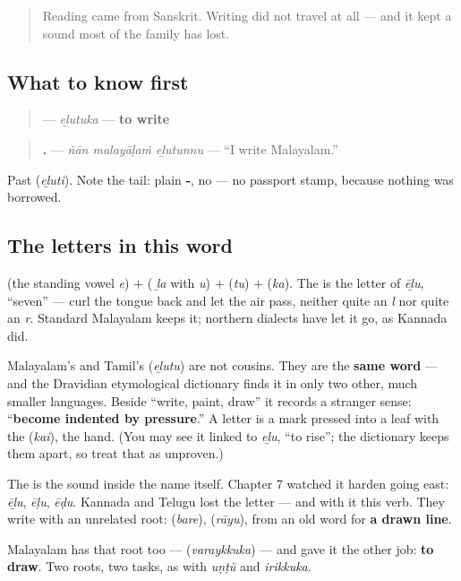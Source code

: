\label{lesson:ML-C33-ezhutuka}



\begin{quote}
Reading came from Sanskrit. Writing did not travel at all — and it kept a sound most of the family has lost.
\end{quote}

\subsection*{What to know first}
\begin{quote}
\textbf{} — \emph{eḻutuka} — \textbf{to write}
\end{quote}

\begin{quote}
\textbf{  .} — \emph{ñān malayāḷaṁ eḻutunnu} — \textquotedblleft{}I write Malayalam.\textquotedblright{}
\end{quote}

Past \textbf{} (\emph{eḻuti}). Note the tail: plain \textbf{‑}, no \textbf{} — no passport stamp, because nothing was borrowed.

\subsection*{The letters in this word}
\textbf{} (the standing vowel \emph{e}) + \textbf{} (\textbf{} \emph{ḻa} with \emph{u}) + \textbf{} (\emph{tu}) + \textbf{} (\emph{ka}). The \textbf{} is the letter of \emph{ēḻu}, \textquotedblleft{}seven\textquotedblright{} — curl the tongue back and let the air pass, neither quite an \emph{l} nor quite an \emph{r}. Standard Malayalam keeps it; northern dialects have let it go, as Kannada did.

\begin{cousinweb}
Malayalam's \textbf{} and Tamil's \textbf{} (\emph{eḻutu}) are not cousins. They are the \textbf{same word} — and the Dravidian etymological dictionary finds it in only two other, much smaller languages. Beside \textquotedblleft{}write, paint, draw\textquotedblright{} it records a stranger sense: \textquotedblleft{}\textbf{become indented by pressure}.\textquotedblright{} A letter is a mark pressed into a leaf with the \textbf{} (\emph{kai}), the hand. (You may see it linked to \textbf{} \emph{eḻu}, \textquotedblleft{}to rise\textquotedblright{}; the dictionary keeps them apart, so treat that as unproven.)

The \textbf{} is the sound inside the name \textbf{} itself. Chapter 7 watched it harden going east: \emph{ēḻu}, \emph{ēḷu}, \emph{ēḍu}. Kannada and Telugu lost the letter — and with it this verb. They write with an unrelated root: \textbf{} (\emph{bare}), \textbf{} (\emph{rāyu}), from an old word for \textbf{a drawn line}.

Malayalam has that root too — \textbf{} (\emph{varaykkuka}) — and gave it the other job: \textbf{to draw}. Two roots, two tasks, as with \emph{uṇṭŭ} and \emph{irikkuka}.
\end{cousinweb}

